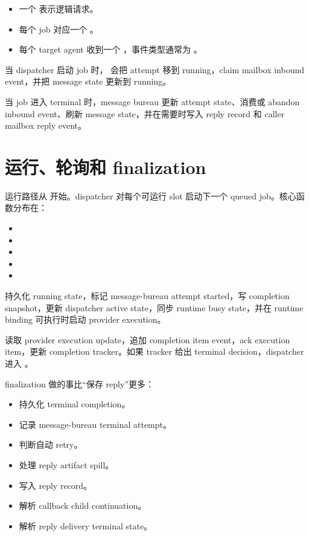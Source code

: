 \begin{itemize}
  \item 一个  表示逻辑请求。
  \item 每个 job 对应一个 。
  \item 每个 target agent 收到一个 ，事件类型通常为 。
\end{itemize}

当 dispatcher 启动 job 时， 会把 attempt 移到 running，claim mailbox inbound event，并把 message state 更新到 running。

当 job 进入 terminal 时，message bureau 更新 attempt state、消费或 abandon inbound event、刷新 message state，并在需要时写入 reply record 和 caller mailbox reply event。

\section{运行、轮询和 finalization}

运行路径从  开始。dispatcher 对每个可运行 slot 启动下一个 queued job。核心函数分布在：

\begin{itemize}
  \item {}
  \item {}
  \item {}
  \item {}
  \item {}
\end{itemize}

 持久化 running state，标记 message-bureau attempt started，写 completion snapshot，更新 dispatcher active state，同步 runtime busy state，并在 runtime binding 可执行时启动 provider execution。

 读取 provider execution update，追加 completion item event，ack execution item，更新 completion tracker。如果 tracker 给出 terminal decision，dispatcher 进入 。

finalization 做的事比“保存 reply”更多：

\begin{itemize}
  \item 持久化 terminal completion。
  \item 记录 message-bureau terminal attempt。
  \item 判断自动 retry。
  \item 处理 reply artifact spill。
  \item 写入 reply record。
  \item 解析 callback child continuation。
  \item 解析 reply delivery terminal state。
\end{itemize}


